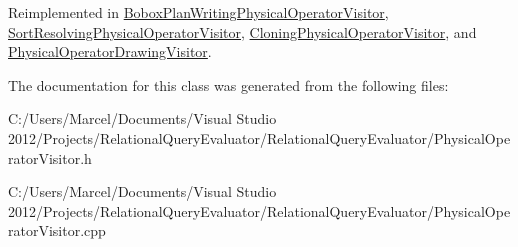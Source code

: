 Reimplemented in \hyperlink{class_bobox_plan_writing_physical_operator_visitor_a87c2ddbe5d05b7dcc30c9d61d540d1f5}{Bobox\+Plan\+Writing\+Physical\+Operator\+Visitor}, \hyperlink{class_sort_resolving_physical_operator_visitor_adced9eb2cd459a8d832dbf4a6811c316}{Sort\+Resolving\+Physical\+Operator\+Visitor}, \hyperlink{class_cloning_physical_operator_visitor_af9199524feba8c12ceff7d78c1915064}{Cloning\+Physical\+Operator\+Visitor}, and \hyperlink{class_physical_operator_drawing_visitor_aeaa1cd49533ed1bb74921262b918bb06}{Physical\+Operator\+Drawing\+Visitor}.



The documentation for this class was generated from the following files\+:\begin{DoxyCompactItemize}
\item 
C\+:/\+Users/\+Marcel/\+Documents/\+Visual Studio 2012/\+Projects/\+Relational\+Query\+Evaluator/\+Relational\+Query\+Evaluator/Physical\+Operator\+Visitor.\+h\item 
C\+:/\+Users/\+Marcel/\+Documents/\+Visual Studio 2012/\+Projects/\+Relational\+Query\+Evaluator/\+Relational\+Query\+Evaluator/Physical\+Operator\+Visitor.\+cpp\end{DoxyCompactItemize}
